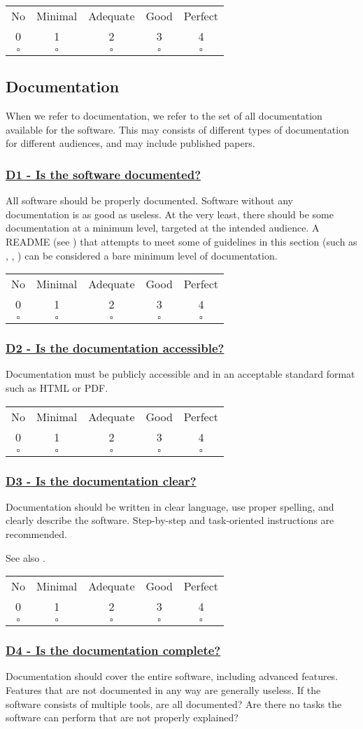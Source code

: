 \documentclass[a4paper,11pt]{article}
\newcommand{\criterion}[2]{\subsubsection*{\underline{#1 - #2}}\label{id:#1}}
\newcommand\CheckTable{%
  \begin{tabular}{ccccc}
    No & Minimal & Adequate & Good & Perfect \\
    0 & 1 & 2 & 3 & 4 \\
    \hline
    $\square$ & $\square$ & $\square$ & $\square$ & $\square$ \\
  \end{tabular}%
}
\newcommand{\refcrit}[1]{%
 \framebox[1.1\width]{\hyperref[id:#1]{#1}}
}
\begin{document}
\CheckTable

\subsection{Documentation}\label{sec:doc}

When we refer to documentation, we refer to the set of all documentation
available for the software. This may consists of different types of
documentation for different audiences, and may include published papers.

\newcommand{\dOneID}{D1}
\newcommand{\dOneText}{Is the software documented?}
\criterion{\dOneID}{\dOneText}

All software should be properly documented. Software without any documentation
is as good as useless. At the very least, there should be some documentation at
a minimum level, targeted at the intended audience. A README (see \refcrit{IS7}) that
attempts to meet some of guidelines in this section (such as
\refcrit{D6},\refcrit{D8},\refcrit{D9}) can be
considered a bare minimum level of documentation.

\CheckTable

%
%
%

\newcommand{\dTwoID}{D2}
\newcommand{\dTwoText}{Is the documentation accessible?}
\criterion{\dTwoID}{\dTwoText}

Documentation must be publicly accessible and in an acceptable standard format
such as HTML or PDF.

\CheckTable

\newcommand{\dThreeID}{D3}
\newcommand{\dThreeText}{Is the documentation clear?}
\criterion{\dThreeID}{\dThreeText}

Documentation should be written in clear language, use proper spelling, and
clearly describe the software. Step-by-step and task-oriented instructions are
recommended.

See also \refcrit{D7}.

\CheckTable

\newcommand{\dFourID}{D4}
\newcommand{\dFourText}{Is the documentation complete?}
\criterion{\dFourID}{\dFourText}

Documentation should cover the entire software, including advanced features.
Features that are not documented in any way are generally useless. If the
software consists of multiple tools, are all documented? Are there no tasks the
software can perform that are not properly explained?
\end{document}
